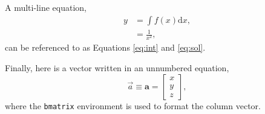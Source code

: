 A multi-line equation,
%
\begin{align}
  y &= \int f(x) \mathrm{d} x,\label{eq:int}\\
  &= \frac{1}{x^2},\label{eq:sol}
\end{align}
%
can be referenced to as Equations \ref{eq:int} and \ref{eq:sol}.

Finally, here is a vector written in an unnumbered equation,
%
\begin{equation*}
  \vec{a} \equiv \bm{a} = 
  \begin{bmatrix}
    x\\y\\z
  \end{bmatrix}
  ,
\end{equation*}
%
where the \texttt{bmatrix} environment is used to format the column vector.
